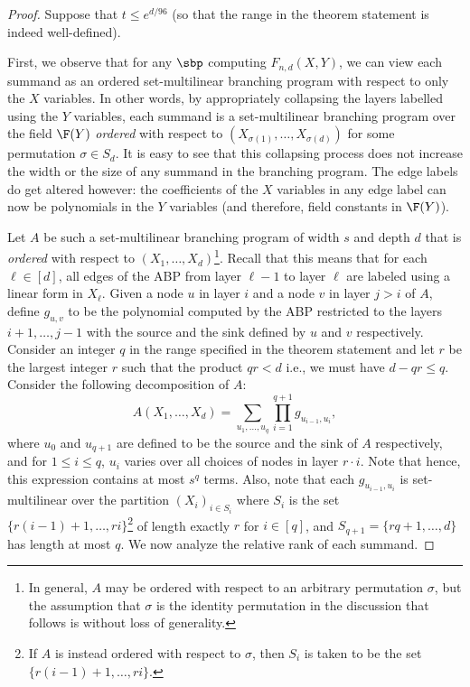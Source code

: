 \documentclass{article}
\begin{document}
\begin{proof}
    Suppose that $t\leq e^{d/96}$ (so that the range in the theorem statement is indeed well-defined). 
    
    First, we observe that for any $\sbp$ computing $F_{n,d}(X,Y)$, we can view each summand as an ordered set-multilinear branching program with respect to only the $X$ variables. 
    In other words, by appropriately collapsing the layers labelled using the $Y$ variables, each summand is a set-multilinear branching program over the field $\F(Y)$ \emph{ordered} with respect to $(X_{\sigma(1)},\ldots, X_{\sigma(d)})$ for some permutation $\sigma\in S_d$. 
    It is easy to see that this collapsing process does not increase the width or the size of any summand in the branching program. 
    The edge labels do get altered however: the coefficients of the $X$ variables in any edge label can now be polynomials in the $Y$ variables (and therefore, field constants in $\F(Y)$).

    Let $A$ be such a set-multilinear branching program of width $s$ and depth $d$ that is \emph{ordered} with respect to $(X_1,\ldots, X_d)$\footnote{In general, $A$ may be ordered with respect to an arbitrary permutation $\sigma$, but the assumption that $\sigma$ is the identity permutation in the discussion that follows is without loss of generality.}. 
    Recall that this means that for each $\ell\in[d]$, all edges of the ABP from layer $\ell-1$ to layer $\ell$ are labeled using a linear form {in} $\mathit{X_\ell}$. 
Given a node $u$ in layer $i$ and a node $v$ in layer $j>i$ of $A$, define $g_{u,v}$ to be the polynomial computed by the ABP restricted to the layers $i+1,\ldots,j-1$ with the source and the sink defined by $u$ and $v$ respectively. Consider an integer $q$ in the range specified in the theorem statement and let $r$ be the largest  integer $r$ such that the product $qr< d$ i.e., we must have $d-qr\leq q$. Consider the following decomposition of $A$:
\[
A(X_1,\ldots,X_d) = \sum_{u_1,\ldots, u_{q}} \prod_{i = 1}^{q+1} g_{u_{i-1},u_i},
\]
where $u_0$ and $u_{q+1}$ are defined to be the source and the sink of $A$ respectively, and for $1\leq i \leq q$, $u_i$ varies over all choices of nodes in layer $r\cdot i$. Note that hence, this expression contains at most $s^q$ terms. Also, note that each $g_{u_{i-1},u_i}$ is set-multilinear over the partition $(X_i)_{i\in S_i}$ where $S_i$ is the set $\{r(i-1) + 1, \ldots, ri\}$\footnote{If $A$ is instead ordered with respect to $\sigma$, then $S_i$ is taken to be the set $\{r(i-1) + 1, \ldots, ri\}$.} of length exactly $r$ for $i\in [q]$, and $S_{q+1}=\{rq+1,\ldots,d\}$ has length at most $q$. We now analyze the relative rank of each summand. 


\end{proof}
\end{document}
